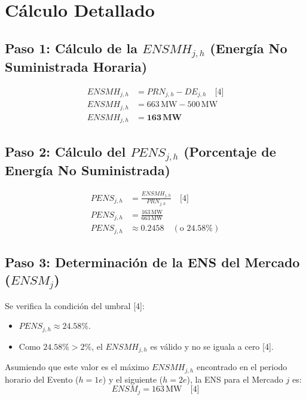 \documentclass[a5paper]{book}%
\begin{document}
  \section*{Cálculo Detallado}
  
  \subsection*{Paso 1: Cálculo de la $ENSMH_{j,h}$ (Energía No Suministrada Horaria)}
  
  \begin{align*}
  	ENSMH_{j,h} &= PRN_{j,h} - DE_{j,h} \quad \text{[4]} \\
  	ENSMH_{j,h} &= 663 \, \text{MW} - 500 \, \text{MW} \\
  	ENSMH_{j,h} &= \mathbf{163 \, \text{MW}}
  \end{align*}
  
  \subsection*{Paso 2: Cálculo del $PENS_{j,h}$ (Porcentaje de Energía No Suministrada)}
  
  \begin{align*}
  	PENS_{j,h} &= \frac{ENSMH_{j,h}}{PRN_{j,h}} \quad \text{[4]} \\
  	PENS_{j,h} &= \frac{163 \, \text{MW}}{663 \, \text{MW}} \\
  	PENS_{j,h} &\approx 0.2458 \quad (\text{o } 24.58\%)
  \end{align*}
  
  \subsection*{Paso 3: Determinación de la ENS del Mercado ($ENSM_j$)}
  
  Se verifica la condición del umbral [4]:
  \begin{itemize}
  	\item $PENS_{j,h} \approx 24.58\%$.
  	\item Como $24.58\% > 2\%$, el $ENSMH_{j,h}$ es válido y no se iguala a cero [4].
  \end{itemize}
  
  Asumiendo que este valor es el máximo $ENSMH_{j,h}$ encontrado en el periodo horario del Evento ($h=1e$) y el siguiente ($h=2e$), la ENS para el Mercado $j$ es:
  \begin{equation*}
  	ENSM_j = 163 \, \text{MW} \quad \text{[4]}
  \end{equation*}
  
\end{document}
